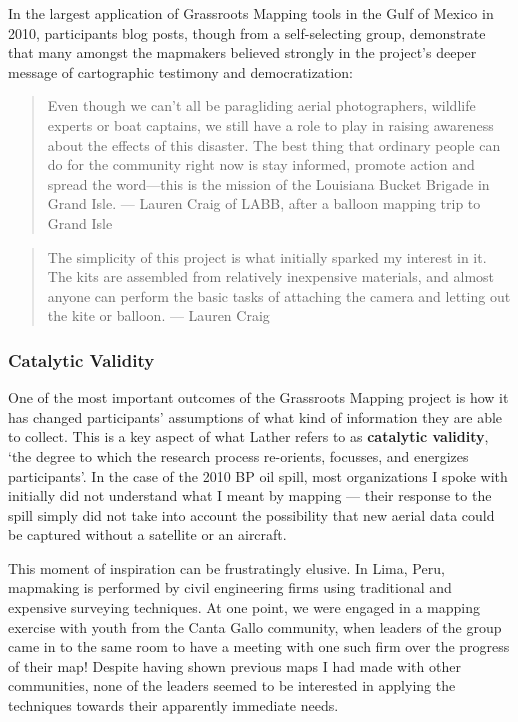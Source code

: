 \documentclass[11pt,oneside,notitlepage]{report}
\begin{document}
In the largest application of Grassroots Mapping tools in the Gulf of Mexico in 2010, participants blog posts, though from a self-selecting group, demonstrate that many amongst the mapmakers believed strongly in the project's deeper message of cartographic testimony and democratization:

\begin{quote}
Even though we can’t all be paragliding aerial photographers, wildlife experts or boat captains, we still have a role to play in raising awareness about the effects of this disaster. The best thing that ordinary people can do for the community right now is stay informed, promote action and spread the word—this is the mission of the Louisiana Bucket Brigade in Grand Isle.
--- Lauren Craig of \ac{LABB}, after a balloon mapping trip to Grand Isle \cite{craig2010labb}
\end{quote}



\begin{quote}
The simplicity of this project is what initially sparked my interest in it. The kits are assembled from relatively inexpensive materials, and almost anyone can perform the basic tasks of attaching the camera and letting out the kite or balloon. --- Lauren Craig
\end{quote}

\subsubsection{Catalytic Validity}

One of the most important outcomes of the Grassroots Mapping project is how it has changed participants' assumptions of what kind of information they are able to collect. This is a key aspect of what Lather refers to as \textbf{catalytic validity}, `the degree to which the research process re-orients, focusses, and energizes participants'. In the case of the 2010 BP oil spill, most organizations I spoke with initially did not understand what I meant by mapping --- their response to the spill simply did not take into account the possibility that new aerial data could be captured without a satellite or an aircraft. 

This moment of inspiration can be frustratingly elusive. In Lima, Peru, mapmaking is performed by civil engineering firms using traditional and expensive surveying techniques. At one point, we were engaged in a mapping exercise with youth from the Canta Gallo community, when leaders of the group came in to the same room to have a meeting with one such firm over the progress of their map! Despite having shown previous maps I had made with other communities, none of the leaders seemed to be interested in applying the techniques towards their apparently immediate needs.  
\end{document}
